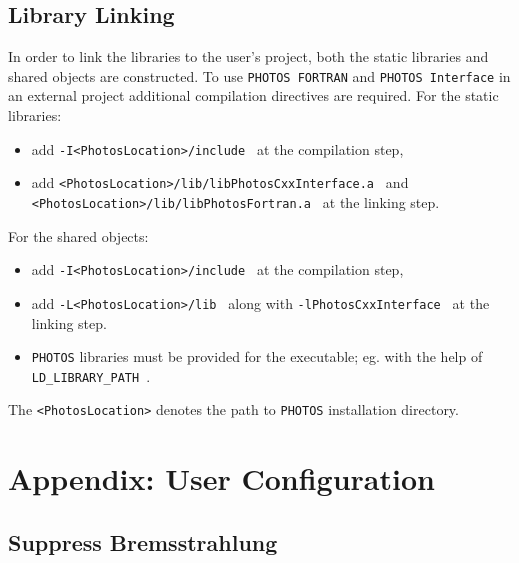 \documentclass[]{Photos_interface_design}
\begin{document}
\subsection{Library Linking}
In order to link the libraries to the user's project, both the static libraries and shared objects are
constructed. To use {\tt PHOTOS FORTRAN} and {\tt PHOTOS Interface} in an external project additional 
compilation directives are required. For the static libraries:
\begin{itemize}
  \item add {\tt -I<PhotosLocation>/include } at the compilation step,
  \item add {\tt <PhotosLocation>/lib/libPhotosCxxInterface.a } and {\tt <PhotosLocation>/lib/libPhotosFortran.a } at the linking step.
\end{itemize}
For the shared objects:
\begin{itemize}
  \item add {\tt -I<PhotosLocation>/include } at the compilation step,
  \item add {\tt -L<PhotosLocation>/lib } along with {\tt -lPhotosCxxInterface } at the linking step.
  \item  {\tt PHOTOS} libraries must be provided for the executable; eg. with the help of  {\tt LD\_LIBRARY\_PATH }.
\end{itemize}
The {\tt <PhotosLocation>} denotes the  path to {\tt PHOTOS} installation directory. 


\section{Appendix: User Configuration}
\label{sec:User Configuration}

\subsection{Suppress Bremsstrahlung}
\label{section:suppress}
\end{document}
